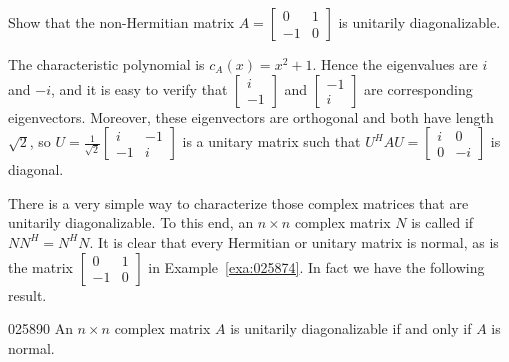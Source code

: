 \documentclass{ximera}
\begin{document}
\begin{example}\label{ex:025874}
Show that the non-Hermitian matrix $A = \left[ \begin{array}{rr}
0 & 1 \\
-1 & 0
\end{array}\right]$ is unitarily diagonalizable.


\begin{explanation}
  The characteristic polynomial is $c_{A}(x) = x^{2} + 1$. Hence the eigenvalues are $i$ and $-i$, and it is easy to verify that $\left[ \begin{array}{r}
  i \\
  -1
  \end{array}\right]$ and $\left[ \begin{array}{r}
  -1 \\
  i
  \end{array}\right]$ are corresponding eigenvectors. Moreover, these eigenvectors are orthogonal and both have length $\sqrt{2}$, so $U = \frac{1}{\sqrt{2}}\left[ \begin{array}{rr}
  i & -1 \\
  -1 & i
  \end{array}\right]$ is a unitary matrix such that $U^HAU = \left[ \begin{array}{rr}
  i & 0 \\
  0 & -i
  \end{array}\right]$ is diagonal.
\end{explanation}
\end{example}

There is a very simple way to characterize those complex matrices that are unitarily diagonalizable. To this end, an $n \times n$ complex matrix $N$ is called  if $NN^{H} = N^{H}N$. It is clear that every Hermitian or unitary matrix is normal, as is the matrix $\left[ \begin{array}{rr}
	0 & 1 \\
	-1 & 0
\end{array}\right]$ in Example~\ref{exa:025874}. In fact we have the following result.

\begin{theorem}{}{025890}
An $n \times n$ complex matrix $A$ is unitarily diagonalizable if and only if $A$ is normal.
\end{theorem}
\end{document}
